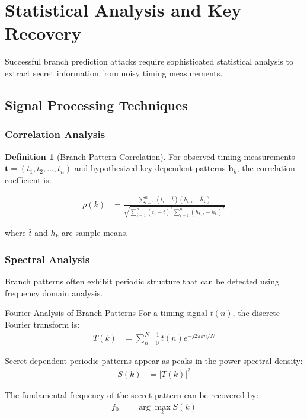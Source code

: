 \documentclass[11pt,a4paper]{article}
\theoremstyle{definition}
\newtheorem{definition}{Definition}[section]
\begin{document}
\section{Statistical Analysis and Key Recovery}

Successful branch prediction attacks require sophisticated statistical analysis to extract secret information from noisy timing measurements.

\subsection{Signal Processing Techniques}

\subsubsection{Correlation Analysis}

\begin{definition}[Branch Pattern Correlation]
For observed timing measurements $\mathbf{t} = (t_1, t_2, \ldots, t_n)$ and hypothesized key-dependent patterns $\mathbf{h}_k$, the correlation coefficient is:

\begin{align}
\rho(k) &= \frac{\sum_{i=1}^n (t_i - \bar{t})(h_{k,i} - \bar{h}_k)}{\sqrt{\sum_{i=1}^n (t_i - \bar{t})^2 \sum_{i=1}^n (h_{k,i} - \bar{h}_k)^2}}
\end{align}

where $\bar{t}$ and $\bar{h}_k$ are sample means.
\end{definition}

\subsubsection{Spectral Analysis}

Branch patterns often exhibit periodic structure that can be detected using frequency domain analysis.

\begin{mathematicsbox}{Fourier Analysis of Branch Patterns}
For a timing signal $t(n)$, the discrete Fourier transform is:
\begin{align}
T(k) &= \sum_{n=0}^{N-1} t(n) e^{-j2\pi kn/N}
\end{align}

Secret-dependent periodic patterns appear as peaks in the power spectral density:
\begin{align}
S(k) &= |T(k)|^2
\end{align}

The fundamental frequency of the secret pattern can be recovered by:
\begin{align}
f_0 &= \arg\max_k S(k)
\end{align}
\end{mathematicsbox}
\end{document}
